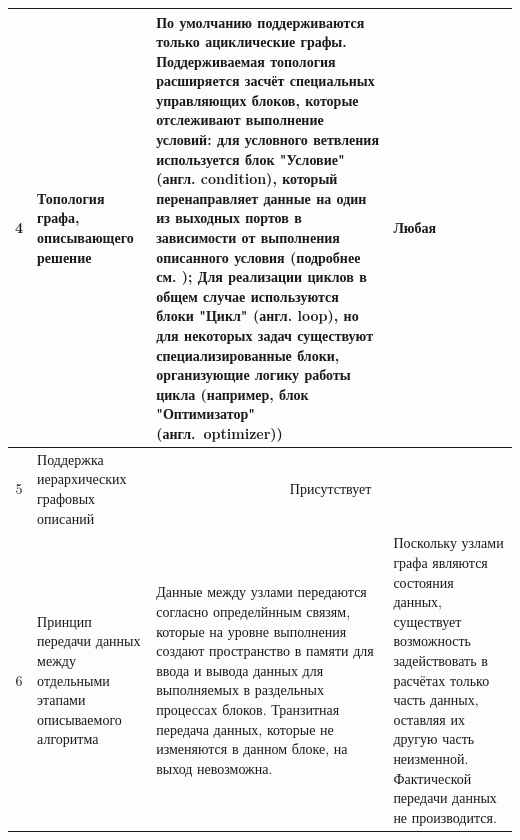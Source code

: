 \begin{landscape}
\begin{longtable}{|c|p{}|p{}|p{}|}
    \hline
    4          & Топология графа, описывающего решение                                                      & По умолчанию поддерживаются только ациклические графы. Поддерживаемая топология расширяется засчёт специальных управляющих блоков, которые отслеживают выполнение условий: для условного ветвления используется блок "Условие" (англ. condition), который перенаправляет данные на один из выходных портов в зависимости от выполнения описанного условия (подробнее см. \cite{pSevenDocsConditons2022}); Для реализации циклов в общем случае используются блоки "Цикл" (англ. loop)\cite{pSevenDocsWorkflow2021}, но для некоторых задач существуют специализированные блоки, организующие логику работы цикла (например, блок "Оптимизатор" (англ.~optimizer)) & Любая                                                                                                                                                                                                                                                                             \\
    \hline
    5          & Поддержка иерархических графовых описаний                                                  & \multicolumn{2}{c|}{Присутствует}                                                                                                                                                                                                                                                                                                                                                                                                                                                                                                                                                                                                                                                                                                                                                                                                                                                                                                                     \\
    \hline
    6          & Принцип передачи данных между отдельными этапами описываемого алгоритма                    & Данные между узлами передаются согласно определйнным связям, которые на уровне выполнения создают пространство в памяти для ввода и вывода данных для выполняемых в раздельных процессах блоков. Транзитная передача данных, которые не изменяются в данном блоке, на выход невозможна.                                                                                                                                                                                                                                                                                                                                                                           & Поскольку узлами графа являются состояния данных, существует возможность задействовать в расчётах только часть данных, оставляя их другую часть неизменной. Фактической передачи данных не производится.                                                                          \\

\end{longtable}
\end{landscape}
